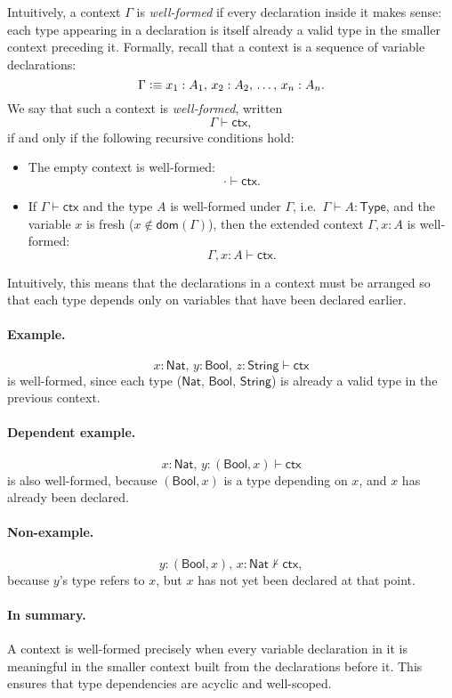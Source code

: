 \documentclass{article}
\newcommand{\Type}{\ensuremath{\mathsf{Type}}}
\newcommand{\defeq}{\vcentcolon\equiv}
\newcommand{\Nat}{\mathsf{Nat}}
\newcommand{\Bool}{\mathsf{Bool}}
\newcommand{\String}{\mathsf{String}}
\newcommand{\emptyctx}{\cdot}              %
\newcommand{\ctx}{\mathsf{ctx}}            %
\newcommand{\judg}[3]{#1 \vdash #2 : #3}   %
\newcommand{\dom}{\mathsf{dom}}            %
\begin{document}
Intuitively, a context \(\Gamma\) is \emph{well-formed} if every declaration inside it makes sense:  
each type appearing in a declaration is itself already a valid type in the smaller context preceding it. Formally, recall that a context is a sequence of variable declarations:
\[
\Gamma \defeq x_1 : A_1,\, x_2 : A_2,\, \dots,\, x_n : A_n.
\]
We say that such a context is \emph{well-formed}, written
\[
\Gamma \vdash \ctx,
\]
if and only if the following recursive conditions hold:
\begin{itemize}
  \item The empty context is well-formed:
    \[
    \emptyctx \vdash \ctx.
    \]
  \item If \(\Gamma \vdash \ctx\) and the type \(A\) is well-formed under \(\Gamma\),
    i.e.\ \(\judg{\Gamma}{A}{\Type}\), and the variable \(x\) is fresh
    (\(x \notin \dom(\Gamma)\)),  
    then the extended context \(\Gamma, x:A\) is well-formed:
    \[
    \Gamma, x:A \vdash \ctx.
    \]
\end{itemize}

Intuitively, this means that the declarations in a context must be arranged so
that each type depends only on variables that have been declared earlier.

\paragraph{Example.}
\[
x:\Nat,\, y:\Bool,\, z:\String \vdash \ctx
\]
is well-formed, since each type (\(\Nat\), \(\Bool\), \(\String\)) is already a valid
type in the previous context.

\paragraph{Dependent example.}
\[
x:\Nat,\, y: (\Bool, x) \vdash \ctx
\]
is also well-formed, because
\((\Bool, x)\) is a type depending on \(x\), and \(x\) has already been declared.

\paragraph{Non-example.}
\[
y:(\Bool, x),\, x:\Nat \not\vdash \ctx,
\]
because \(y\)’s type refers to \(x\), but \(x\) has not yet been declared at that point.

\paragraph{In summary.}
A context is well-formed precisely when every variable declaration in it is
meaningful in the smaller context built from the declarations before it.  
This ensures that type dependencies are acyclic and well-scoped.
\end{document}
